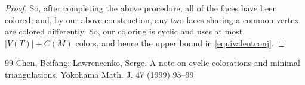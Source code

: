 \documentclass[10pt,a4paper]{amsart}
\begin{document}
\begin{proof}
 So, after completing the above procedure, all of the faces have been colored, and, by our above construction, any two faces sharing a 
 common vertex are colored differently. So, our coloring is cyclic and uses at most $\left| V(T) \right| + C(M)$ colors, and hence the 
 upper bound in \eqref{equivalentconj}. 
\end{proof}


\begin{thebibliography}{99}
 Chen, Beifang; Lawrencenko, Serge. A note on cyclic colorations and minimal triangulations. Yokohama Math. J. 47 (1999) 93--99
\end{thebibliography}
\end{document}
